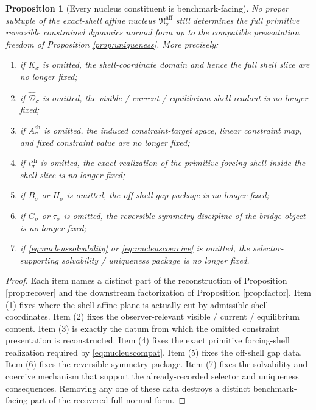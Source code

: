 \documentclass[11pt]{article}
\newcommand{\CoordBody}[1]{K_{#1}}
\newcommand{\NormalBody}[1]{B_{#1}}
\newcommand{\AffineData}[1]{\widehat{\mathcal D}_{#1}}
\newcommand{\NormalOperator}[1]{H_{#1}}
\newcommand{\SymGroup}[1]{G_{#1}}
\newcommand{\TimeRev}[1]{\tau_{#1}}
\newcommand{\ShellAffine}[1]{A_{#1}^{\mathrm{sh}}}
\newcommand{\ShellEmbed}[1]{\iota_{#1}^{\mathrm{sh}}}
\newcommand{\AffineNucleus}[1]{\mathfrak N_{#1}^{\mathrm{aff}}}
\newtheorem{proposition}{Proposition}
\begin{document}
\begin{proposition}[Every nucleus constituent is benchmark-facing]
\label{prop:minimal}
No proper subtuple of the exact-shell affine nucleus \(\AffineNucleus{\sigma}\) still determines the full primitive reversible constrained dynamics normal form up to the compatible presentation freedom of Proposition \ref{prop:uniqueness}. More precisely:
\begin{enumerate}
    \item if \(\CoordBody{\sigma}\) is omitted, the shell-coordinate domain and hence the full shell slice are no longer fixed;
    \item if \(\AffineData{\sigma}\) is omitted, the visible / current / equilibrium shell readout is no longer fixed;
    \item if \(\ShellAffine{\sigma}\) is omitted, the induced constraint-target space, linear constraint map, and fixed constraint value are no longer fixed;
    \item if \(\ShellEmbed{\sigma}\) is omitted, the exact realization of the primitive forcing shell inside the shell slice is no longer fixed;
    \item if \(\NormalBody{\sigma}\) or \(\NormalOperator{\sigma}\) is omitted, the off-shell gap package is no longer fixed;
    \item if \(\SymGroup{\sigma}\) or \(\TimeRev{\sigma}\) is omitted, the reversible symmetry discipline of the bridge object is no longer fixed;
    \item if \eqref{eq:nucleussolvability} or \eqref{eq:nucleuscoercive} is omitted, the selector-supporting solvability / uniqueness package is no longer fixed.
\end{enumerate}
\end{proposition}

\begin{proof}
Each item names a distinct part of the reconstruction of Proposition \ref{prop:recover} and the downstream factorization of Proposition \ref{prop:factor}. Item (1) fixes where the shell affine plane is actually cut by admissible shell coordinates. Item (2) fixes the observer-relevant visible / current / equilibrium content. Item (3) is exactly the datum from which the omitted constraint presentation is reconstructed. Item (4) fixes the exact primitive forcing-shell realization required by \eqref{eq:nucleuscompat}. Item (5) fixes the off-shell gap data. Item (6) fixes the reversible symmetry package. Item (7) fixes the solvability and coercive mechanism that support the already-recorded selector and uniqueness consequences. Removing any one of these data destroys a distinct benchmark-facing part of the recovered full normal form.
\end{proof}
\end{document}
